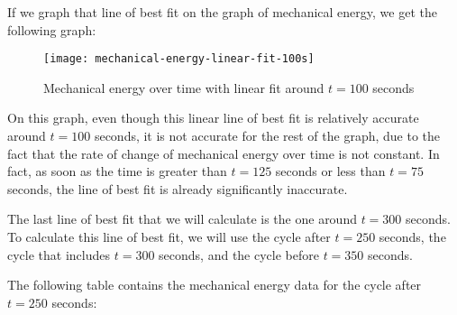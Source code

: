 \documentclass{article}
\begin{document}
            If we graph that line of best fit on the graph of mechanical energy, we get the following graph:
            
            \begin{figure}[H]
                \centering
                \texttt{[image: mechanical-energy-linear-fit-100s]}
                \caption{Mechanical energy over time with linear fit around $t=100$ seconds}
                \label{fig:mechanical-energy-linear-fit-100s}
            \end{figure}
            
            On this graph, even though this linear line of best fit is relatively accurate around $t=100$ seconds, it is not accurate for the rest of the graph, due to the fact that the rate of change of mechanical energy over time is not constant. In fact, as soon as the time is greater than $t=125$ seconds or less than $t=75$ seconds, the line of best fit is already significantly inaccurate.
            
            The last line of best fit that we will calculate is the one around $t=300$ seconds. To calculate this line of best fit, we will use the cycle after $t=250$ seconds, the cycle that includes $t=300$ seconds, and the cycle before $t=350$ seconds.
            
            The following table contains the mechanical energy data for the cycle after $t=250$ seconds:
            
\end{document}
